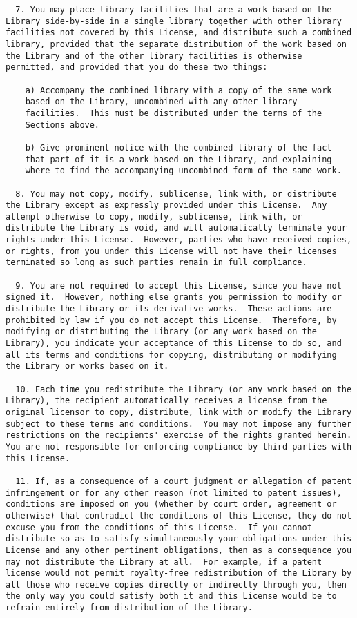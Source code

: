 \documentclass{InsightBook}
\begin{document}
\begin{verbatim}
  7. You may place library facilities that are a work based on the
Library side-by-side in a single library together with other library
facilities not covered by this License, and distribute such a combined
library, provided that the separate distribution of the work based on
the Library and of the other library facilities is otherwise
permitted, and provided that you do these two things:

    a) Accompany the combined library with a copy of the same work
    based on the Library, uncombined with any other library
    facilities.  This must be distributed under the terms of the
    Sections above.

    b) Give prominent notice with the combined library of the fact
    that part of it is a work based on the Library, and explaining
    where to find the accompanying uncombined form of the same work.

  8. You may not copy, modify, sublicense, link with, or distribute
the Library except as expressly provided under this License.  Any
attempt otherwise to copy, modify, sublicense, link with, or
distribute the Library is void, and will automatically terminate your
rights under this License.  However, parties who have received copies,
or rights, from you under this License will not have their licenses
terminated so long as such parties remain in full compliance.

  9. You are not required to accept this License, since you have not
signed it.  However, nothing else grants you permission to modify or
distribute the Library or its derivative works.  These actions are
prohibited by law if you do not accept this License.  Therefore, by
modifying or distributing the Library (or any work based on the
Library), you indicate your acceptance of this License to do so, and
all its terms and conditions for copying, distributing or modifying
the Library or works based on it.

  10. Each time you redistribute the Library (or any work based on the
Library), the recipient automatically receives a license from the
original licensor to copy, distribute, link with or modify the Library
subject to these terms and conditions.  You may not impose any further
restrictions on the recipients' exercise of the rights granted herein.
You are not responsible for enforcing compliance by third parties with
this License.

  11. If, as a consequence of a court judgment or allegation of patent
infringement or for any other reason (not limited to patent issues),
conditions are imposed on you (whether by court order, agreement or
otherwise) that contradict the conditions of this License, they do not
excuse you from the conditions of this License.  If you cannot
distribute so as to satisfy simultaneously your obligations under this
License and any other pertinent obligations, then as a consequence you
may not distribute the Library at all.  For example, if a patent
license would not permit royalty-free redistribution of the Library by
all those who receive copies directly or indirectly through you, then
the only way you could satisfy both it and this License would be to
refrain entirely from distribution of the Library.


\end{verbatim}
\end{document}
